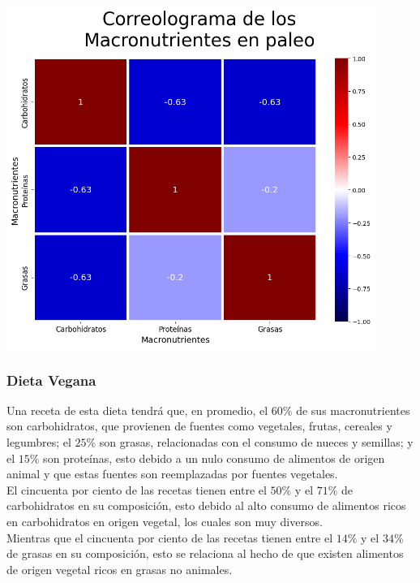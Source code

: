 \documentclass[12pt,a4paper]{article}
\begin{document}
            \begin{center}
                \includegraphics[width=0.90\textwidth]{Resources/2_03_plot_04_4.png}
            \end{center}

        \subsubsection{Dieta Vegana}

            Una receta de esta dieta tendrá que, en promedio, el $60\%$ de 
            sus macronutrientes son carbohidratos, que provienen de fuentes 
            como vegetales, frutas, cereales y legumbres; el $25\%$ son grasas, 
            relacionadas con el consumo de nueces y semillas; y el $15\%$ son 
            proteínas, esto debido a un nulo consumo de alimentos de origen 
            animal y que estas fuentes son reemplazadas por fuentes vegetales.\\

            El cincuenta por ciento de las recetas tienen entre el $50\%$ y el $71\%$ 
            de carbohidratos en su composición, esto debido al alto consumo de 
            alimentos ricos en carbohidratos en origen vegetal, los cuales son 
            muy diversos.\\

            Mientras que el cincuenta por ciento de las recetas tienen entre el $14\%$ y 
            el $34\%$ de grasas en su composición, esto se relaciona al hecho de que 
            existen alimentos de origen vegetal ricos en grasas no animales.\\
            
\end{document}
